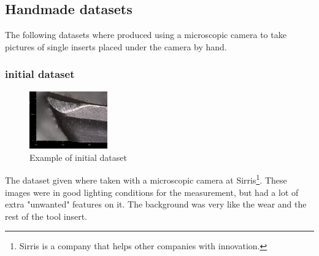 	\subsection{Handmade datasets}

The following datasets where produced using a microscopic camera to take pictures of single inserts placed under the camera by hand. 

		\subsubsection{initial dataset}

			
			
			\begin{figure}[hbtp]
			\centering
			\includegraphics[width=0.3\textwidth]{fig/Vision/Dataset/handmade_datasets/initial_dataset/initial dataset pictuer.PNG}
			\caption{Example of initial dataset}
			\label{fig:dataset:initial}
			\end{figure}


The dataset given where taken with a microscopic camera at Sirris\footnote{Sirris is a company that helps other companies with innovation. }. These images were in good lighting conditions for the measurement, but had a lot of extra "unwanted" features on it. The background was very like the wear and the rest of the tool insert. 


